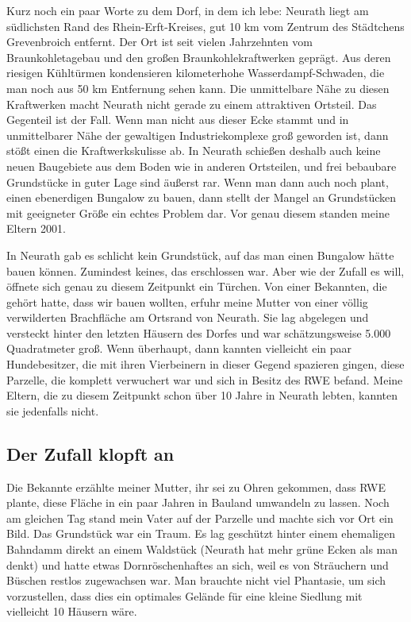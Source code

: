\documentclass[fontsize=14pt,a4paper,headinclude,DIV=calc,automark]{scrbook}
\begin{document}
Kurz noch ein paar Worte zu dem Dorf, in dem ich lebe: Neurath liegt am südlichsten Rand des Rhein-Erft-Kreises, gut 10 km vom Zentrum des Städtchens Grevenbroich entfernt. Der Ort ist seit vielen Jahrzehnten vom Braunkohletagebau und den großen Braunkohlekraftwerken geprägt. Aus deren riesigen Kühltürmen kondensieren kilometerhohe Wasserdampf-Schwaden, die man noch aus 50 km Entfernung sehen kann. Die unmittelbare Nähe zu diesen Kraftwerken macht Neurath nicht gerade zu einem attraktiven Ortsteil. Das Gegenteil ist der Fall. Wenn man nicht aus dieser Ecke stammt und in unmittelbarer Nähe der gewaltigen Industriekomplexe groß geworden ist, dann stößt einen die Kraftwerkskulisse ab. In Neurath schießen deshalb auch keine neuen Baugebiete aus dem Boden wie in anderen Ortsteilen, und frei bebaubare Grundstücke in guter Lage sind äußerst rar. Wenn man dann auch noch plant, einen ebenerdigen Bungalow zu bauen, dann stellt der Mangel an Grundstücken mit geeigneter Größe ein echtes Problem dar. Vor genau diesem standen meine Eltern 2001.

In Neurath gab es schlicht kein Grundstück, auf das man einen Bungalow hätte bauen können. Zumindest keines, das erschlossen war. Aber wie der Zufall es will, öffnete sich genau zu diesem Zeitpunkt ein Türchen. Von einer Bekannten, die gehört hatte, dass wir bauen wollten, erfuhr meine Mutter von einer völlig verwilderten Brachfläche am Ortsrand von Neurath. Sie lag abgelegen und versteckt hinter den letzten Häusern des Dorfes und war schätzungsweise 5.000 Quadratmeter groß. Wenn überhaupt, dann kannten vielleicht ein paar Hundebesitzer, die mit ihren Vierbeinern in dieser Gegend spazieren gingen, diese Parzelle, die komplett verwuchert war und sich in Besitz des RWE befand. Meine Eltern, die zu diesem Zeitpunkt schon über 10 Jahre in Neurath lebten, kannten sie jedenfalls nicht.

\subsection{Der Zufall klopft an}

Die Bekannte erzählte meiner Mutter, ihr sei zu Ohren gekommen, dass RWE plante, diese Fläche in ein paar Jahren in Bauland umwandeln zu lassen. Noch am gleichen Tag stand mein Vater auf der Parzelle und machte sich vor Ort ein Bild. Das Grundstück war ein Traum. Es lag geschützt hinter einem ehemaligen Bahndamm direkt an einem Waldstück (Neurath hat mehr grüne Ecken als man denkt) und hatte etwas Dornröschenhaftes an sich, weil es von Sträuchern und Büschen restlos zugewachsen war. Man brauchte nicht viel Phantasie, um sich vorzustellen, dass dies ein optimales Gelände für eine kleine Siedlung mit vielleicht 10 Häusern wäre.
\end{document}
